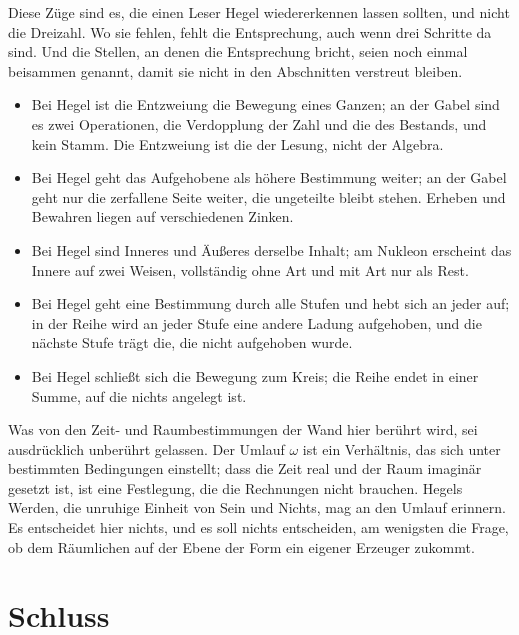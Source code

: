 \documentclass[11pt,a4paper]{article}
\begin{document}
Diese Züge sind es, die einen Leser Hegel wiedererkennen lassen sollten, und nicht die Dreizahl. Wo sie fehlen, fehlt die Entsprechung, auch wenn drei Schritte da sind. Und die Stellen, an denen die Entsprechung bricht, seien noch einmal beisammen genannt, damit sie nicht in den Abschnitten verstreut bleiben.

\begin{itemize}[leftmargin=1.6em,itemsep=2pt]
\item Bei Hegel ist die Entzweiung die Bewegung eines Ganzen; an der Gabel sind es zwei Operationen, die Verdopplung der Zahl und die des Bestands, und kein Stamm. Die Entzweiung ist die der Lesung, nicht der Algebra.
\item Bei Hegel geht das Aufgehobene als höhere Bestimmung weiter; an der Gabel geht nur die zerfallene Seite weiter, die ungeteilte bleibt stehen. Erheben und Bewahren liegen auf verschiedenen Zinken.
\item Bei Hegel sind Inneres und Äußeres derselbe Inhalt; am Nukleon erscheint das Innere auf zwei Weisen, vollständig ohne Art und mit Art nur als Rest.
\item Bei Hegel geht eine Bestimmung durch alle Stufen und hebt sich an jeder auf; in der Reihe wird an jeder Stufe eine andere Ladung aufgehoben, und die nächste Stufe trägt die, die nicht aufgehoben wurde.
\item Bei Hegel schließt sich die Bewegung zum Kreis; die Reihe endet in einer Summe, auf die nichts angelegt ist.
\end{itemize}

Was von den Zeit- und Raumbestimmungen der Wand hier berührt wird, sei ausdrücklich unberührt gelassen. Der Umlauf $\omega$ ist ein Verhältnis, das sich unter bestimmten Bedingungen einstellt; dass die Zeit real und der Raum imaginär gesetzt ist, ist eine Festlegung, die die Rechnungen nicht brauchen. Hegels Werden, die unruhige Einheit von Sein und Nichts, mag an den Umlauf erinnern. Es entscheidet hier nichts, und es soll nichts entscheiden, am wenigsten die Frage, ob dem Räumlichen auf der Ebene der Form ein eigener Erzeuger zukommt.

\section*{Schluss}
\end{document}
